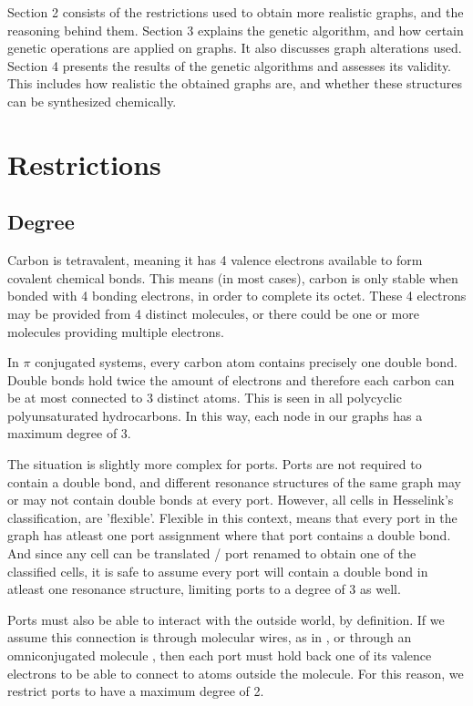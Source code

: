 \documentclass[12pt]{article}
\begin{document}
Section 2 consists of the restrictions used to obtain more realistic graphs, and the reasoning behind them. Section 3 explains the genetic algorithm, and how certain genetic operations are applied on graphs. It also discusses graph alterations used. Section 4 presents the results of the genetic algorithms and assesses its validity. This includes how realistic the obtained graphs are, and whether these structures can be synthesized chemically. %

\section{Restrictions}

\subsection{Degree}

Carbon is tetravalent, meaning it has 4 valence electrons available to form covalent chemical bonds. This means (in most cases), carbon is only stable when bonded with 4 bonding electrons, in order to complete its octet. These 4 electrons may be provided from 4 distinct molecules, or there could be one or more molecules providing multiple electrons.

In $\pi$ conjugated systems, every carbon atom contains precisely one double bond. Double bonds hold twice the amount of electrons and therefore each carbon can be at most connected to 3 distinct atoms. This is seen in all polycyclic polyunsaturated hydrocarbons. In this way, each node in our graphs has a maximum degree of 3. 

The situation is slightly more complex for ports. Ports are not required to contain a double bond, and different resonance structures of the same graph may or may not contain double bonds at every port. However, all cells in Hesselink's classification, are 'flexible'. Flexible in this context, means that every port in the graph has atleast one port assignment where that port contains a double bond. And since any cell can be translated / port renamed to obtain one of the classified cells, it is safe to assume every port will contain a double bond in atleast one resonance structure, limiting ports to a degree of 3 as well. 

Ports must also be able to interact with the outside world, by definition. If we assume this connection is through molecular wires, as in \cite{9}, or through an omniconjugated molecule \cite{v06}, then each port must hold back one of its valence electrons to be able to connect to atoms outside the molecule. For this reason, we restrict ports to have a maximum degree of 2. 
\end{document}
